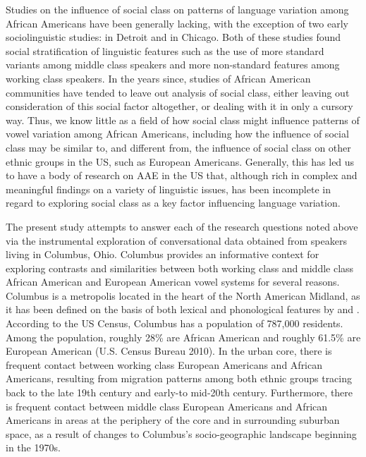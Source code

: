 \documentclass[output=paper,colorlinks,citecolor=brown]{langscibook}
\begin{document}
\hspace*{-1mm}Studies on the influence of social class on patterns of language variation among African Americans have been generally lacking, with the exception of two early sociolinguistic studies: \citet{wolfram1969} in Detroit and \citet{Pederson1965} in Chicago. Both of these studies found social stratification of linguistic features such as the use of more standard variants among middle class speakers and more non-standard features among working class speakers. In the years since, studies of African American communities have tended to leave out analysis of social class, either leaving out consideration of this social factor altogether, or dealing with it in only a cursory way. Thus, we know little as a field of how social class might influence patterns of vowel variation among African Americans, including how the influence of social class may be similar to, and different from, the influence of social class on other ethnic groups in the US, such as European Americans. Generally, this has led us to have a body of research on AAE in the US that, although rich in complex and meaningful findings on a variety of linguistic issues, has been incomplete in regard to exploring social class as a key factor influencing language variation.

The present study attempts to answer each of the research questions noted above via the instrumental exploration of conversational data obtained from speakers living in Columbus, Ohio. Columbus provides an informative context for exploring contrasts and similarities between both working class and middle class African American and European American vowel systems for several reasons. Columbus is a metropolis located in the heart of the North American Midland, as it has been defined on the basis of both lexical and phonological features by \citet{Carver1987} and \citet{labov2006atlas}. According to the \citeyear{CensusBureau2010} US Census, Columbus has a population of 787,000 residents. Among the population, roughly 28\% are African American and roughly 61.5\% are European American (U.S. Census Bureau 2010). In the urban core, there is frequent contact between working class European Americans and African Americans, resulting from migration patterns among both ethnic groups tracing back to the late 19th century and early-to mid-20th century. Furthermore, there is frequent contact between middle class European Americans and African Americans in areas at the periphery of the core and in surrounding suburban space, as a result of changes to Columbus’s socio-geographic landscape beginning in the 1970s.
\end{document}
